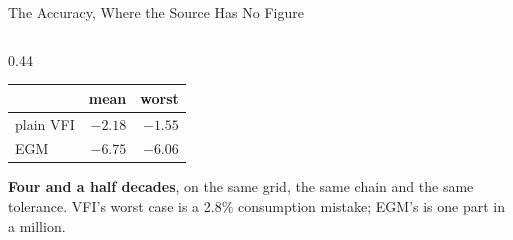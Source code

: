\begin{frame}{The Accuracy, Where the Source Has No Figure}
\begin{columns}[c]
\begin{column}{0.44\textwidth}
\begin{center}
\begin{tabularx}{\linewidth}{@{}>{\raggedright\arraybackslash}X r r@{}}
\toprule
 & \textbf{mean} & \textbf{worst} \\
\midrule
plain VFI & $-2.18$ & $-1.55$ \\
EGM & $\mathbf{-6.75}$ & $\mathbf{-6.06}$ \\
\bottomrule
\end{tabularx}
\end{center}
\medskip
\begin{takeawaybox}\footnotesize
\textbf{Four and a half decades}, on the same grid, the same chain and the same tolerance. VFI's worst case is a 2.8\% consumption mistake; EGM's is one part in a million.
\end{takeawaybox}
\end{column}
\end{columns}
\vspace{1mm}
\end{frame}

